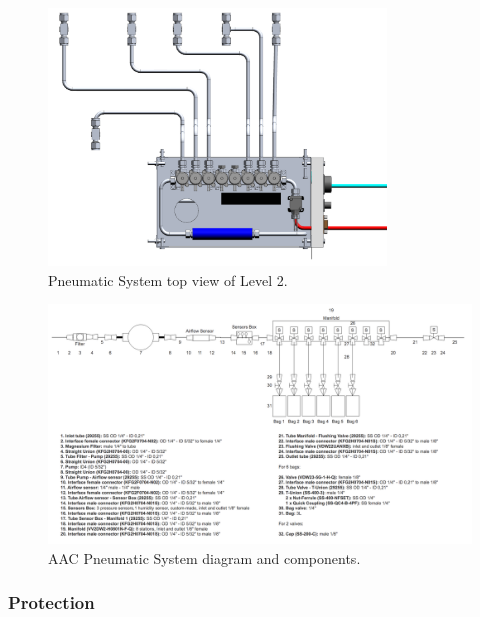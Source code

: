 \begin{figure}[H]
    \centering
    \includegraphics[width=0.8\textwidth]{4-experiment-design/img/Mechanical/Pneumatic_System_Top_View_Level_2.png}
    \caption{Pneumatic System top view of Level 2.}
    \label{level_2_pneumatic_system_top_view}
\end{figure}


\newpage
\begin{landscape}
\begin{figure}[H]
    \centering
    \includegraphics[width=1.5\textwidth]{4-experiment-design/img/Mechanical/AAC_Subsystem.png}
    \caption{AAC Pneumatic System diagram and components.}
    \label{pneumatic_system}
\end{figure}
\end{landscape}


\pagebreak
\subsubsection{Protection}

